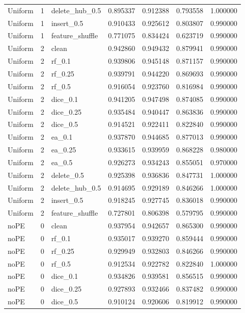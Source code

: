 \documentclass[UTF8,a4paper,11pt,fontset=fandol]{ctexart}
\begin{document}
{\begin{longtable}{lrlrrrr}
Uniform & 1 & delete\_hub\_0.5 & 0.895337 & 0.912388 & 0.793558 & 1.000000 \\
Uniform & 1 & insert\_0.5 & 0.910433 & 0.925612 & 0.803807 & 0.990000 \\
Uniform & 1 & feature\_shuffle & 0.771075 & 0.834424 & 0.623719 & 0.990000 \\
Uniform & 2 & clean & 0.942860 & 0.949432 & 0.879941 & 0.990000 \\
Uniform & 2 & rf\_0.1 & 0.939806 & 0.945148 & 0.871157 & 0.990000 \\
Uniform & 2 & rf\_0.25 & 0.939791 & 0.944220 & 0.869693 & 0.990000 \\
Uniform & 2 & rf\_0.5 & 0.916054 & 0.923760 & 0.816984 & 0.990000 \\
Uniform & 2 & dice\_0.1 & 0.941205 & 0.947498 & 0.874085 & 0.990000 \\
Uniform & 2 & dice\_0.25 & 0.935484 & 0.940447 & 0.863836 & 0.990000 \\
Uniform & 2 & dice\_0.5 & 0.914521 & 0.922411 & 0.822840 & 0.990000 \\
Uniform & 2 & ea\_0.1 & 0.937870 & 0.944685 & 0.877013 & 0.990000 \\
Uniform & 2 & ea\_0.25 & 0.933615 & 0.939959 & 0.868228 & 0.980000 \\
Uniform & 2 & ea\_0.5 & 0.926273 & 0.934243 & 0.855051 & 0.970000 \\
Uniform & 2 & delete\_0.5 & 0.925398 & 0.936836 & 0.847731 & 1.000000 \\
Uniform & 2 & delete\_hub\_0.5 & 0.914695 & 0.929189 & 0.846266 & 1.000000 \\
Uniform & 2 & insert\_0.5 & 0.918245 & 0.927745 & 0.836018 & 0.990000 \\
Uniform & 2 & feature\_shuffle & 0.727801 & 0.806398 & 0.579795 & 0.990000 \\
noPE & 0 & clean & 0.937954 & 0.942657 & 0.865300 & 0.990000 \\
noPE & 0 & rf\_0.1 & 0.935017 & 0.939270 & 0.859444 & 0.990000 \\
noPE & 0 & rf\_0.25 & 0.929949 & 0.932803 & 0.846266 & 0.990000 \\
noPE & 0 & rf\_0.5 & 0.912534 & 0.922782 & 0.822840 & 1.000000 \\
noPE & 0 & dice\_0.1 & 0.934826 & 0.939581 & 0.856515 & 0.990000 \\
noPE & 0 & dice\_0.25 & 0.927893 & 0.932466 & 0.837482 & 0.990000 \\
noPE & 0 & dice\_0.5 & 0.910124 & 0.920606 & 0.819912 & 0.990000 \\

\end{longtable}}
\end{document}
